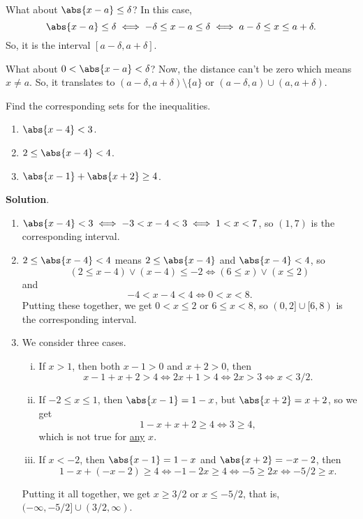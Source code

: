What about $ \abs{x-a}\le \delta $? In this case,
\[ \abs{x-a}\le \delta\iff -\delta\le x-a\le \delta\iff a-\delta\le x\le a+\delta. \]
So, it is the interval $ [a-\delta,a+\delta] $.

What about $ 0<\abs{x-a}<\delta $? Now, the distance can't be zero which means $ x\ne a $. So,
it translates to $ (a-\delta,a+\delta)\setminus\{a\} $ or $ (a-\delta,a)\cup (a,a+\delta) $.

\begin{Example}{}{}
    Find the corresponding sets for the inequalities.
    \begin{enumerate}[(1)]
        \item $ \abs{x-4}<3 $.
        \item $ 2\le \abs{x-4}<4 $.
        \item $ \abs{x-1}+\abs{x+2}\ge 4 $.
    \end{enumerate}
    \tcblower{}
    \textbf{Solution}.
    \begin{enumerate}[(1)]
        \item $ \abs{x-4}<3\iff -3<x-4<3\iff 1<x<7 $, so $ (1,7) $ is the corresponding interval.
        \item $ 2\le \abs{x-4}<4 $ means $ 2\le \abs{x-4} $ and $ \abs{x-4}<4 $, so
              \[ (2\le x-4)\lor (x-4)\le -2\iff (6\le x)\lor (x\le 2) \]
              and
              \[ -4<x-4<4\iff 0<x<8. \]
              Putting these together, we get $ 0<x\le 2 $ or $ 6\le x<8 $, so $ (0,2]\cup [6,8) $ is the corresponding interval.
        \item We consider three cases.
              \begin{enumerate}[(i)]
                  \item If $ x> 1 $, then both $ x-1> 0 $ and $ x+2> 0 $, then
                        \[ x-1+x+2> 4\iff 2x+1> 4\iff 2x> 3\iff x< 3/2. \]
                  \item If $ -2\le x\le 1 $, then $ \abs{x-1}=1-x $, but $ \abs{x+2}=x+2 $, so we get
                        \[ 1-x+x+2\ge 4\iff 3\ge 4, \] which is not true for \underline{any} $ x $.
                  \item If $ x<-2 $, then $ \abs{x-1}=1-x $ and $ \abs{x+2}=-x-2 $, then
                        \[ 1-x+(-x-2)\ge 4\iff -1-2x\ge 4\iff -5\ge 2x\iff -5/2\ge x. \]
              \end{enumerate}
              Putting it all together, we get $ x\ge 3/2 $ or $ x\le -5/2 $, that is,
              $ (-\infty,-5/2]\cup (3/2,\infty) $.
    \end{enumerate}
\end{Example}